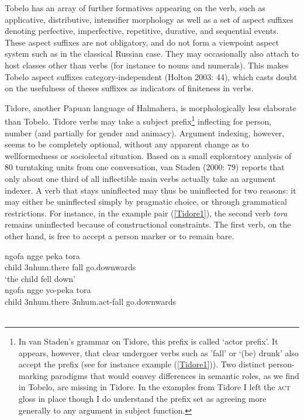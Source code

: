 Tobelo has an array of further formatives appearing on the verb, such as applicative, distributive, intensifier morphology as well as a set of aspect suffixes denoting perfective, imperfective, repetitive, durative, and sequential events. These aspect suffixes are not obligatory, and do not form a viewpoint aspect system such as in the classical Russian case. They may occasionally also attach to host classes other than verbs (for instance to nouns and numerals). This makes Tobelo aspect suffixes category-independent (Holton 2003: 44), which casts doubt on the usefulness of theses suffixes as indicators of finiteness in verbs. 

Tidore, another Papuan language of Halmahera, is morphologically less elaborate than Tobelo. Tidore verbs may take a subject prefix\footnote{In van Staden's grammar on Tidore, this prefix is called `actor prefix'. It appears, however, that clear undergoer verbs such as 'fall' or `(be) drunk' also accept the prefix (see for instance example (\ref{Tidore1})). Two distinct person-marking paradigms that would convey differences in semantic roles, as we find in Tobelo, are missing in Tidore. In the examples from Tidore I left the \textsc{act} gloss in place though I do understand the prefix set as agreeing more generally to any argument in subject function.} inflecting for person, number (and partially for gender and animacy). Argument indexing, however, seems to be completely optional, without any apparent change as to wellformedness or sociolectal situation. Based on a small exploratory analysis of 80 turntaking units from one conversation, van Staden (2000: 79) reports that only about one third of all inflectible main verbs actually take an argument indexer. A verb that stays uninflected may thus be uninflected for two reasons: it may either be uninflected simply by pragmatic choice, or through grammatical restrictions. For instance, in the example pair (\ref{Tidore1}), the second verb \textit{tora} remains uninflected because of constructional constraints. The first verb, on the other hand, is free to accept a person marker or to remain bare.

\pex \label{Tidore1}
\a
\gll ngofa ngge peka tora \\
child 3\acs{nhum}.there fall go.downwards \\
\glft `the child fell down’ \\ 
\z
\a
\gla ngofa ngge yo-peka tora \\ 
child 3\acs{nhum}.there 3\acs{nhum}.\acs{act}-fall go.downwards \\
\glft  {}\\ 
\z
\xe


